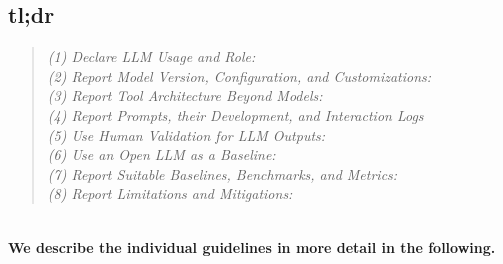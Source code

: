 



\subsection{tl;dr}

\begin{quote}
\emph{(1) Declare LLM Usage and Role:}\\


\emph{(2) Report Model Version, Configuration, and Customizations:}\\


\emph{(3) Report Tool Architecture Beyond Models:}\\


\emph{(4) Report Prompts, their Development, and Interaction Logs}\\


\emph{(5) Use Human Validation for LLM Outputs:}\\


\emph{(6) Use an Open LLM as a Baseline:}\\


\emph{(7) Report Suitable Baselines, Benchmarks, and Metrics:}\\


\emph{(8) Report Limitations and Mitigations:}\\

\end{quote}

\ \\
\textbf{We describe the individual guidelines in more detail in the following.}

